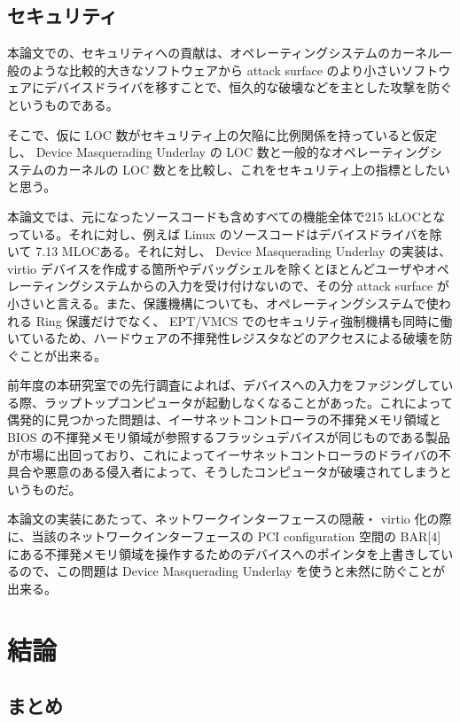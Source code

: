 \documentclass[a4paper,11pt,report]{ltjsbook}
\begin{document}
\section{セキュリティ}

本論文での、セキュリティへの貢献は、オペレーティングシステムのカーネル一般のような比較的大きなソフトウェアから attack surface のより小さいソフトウェアにデバイスドライバを移すことで、恒久的な破壊などを主とした攻撃を防ぐというものである。

そこで、仮に LOC 数がセキュリティ上の欠陥に比例関係を持っていると仮定し、 Device Masquerading Underlay の LOC 数と一般的なオペレーティングシステムのカーネルの LOC 数とを比較し、これをセキュリティ上の指標としたいと思う。

本論文では、元になったソースコードも含めすべての機能全体で215 kLOCとなっている。それに対し、例えば Linux のソースコードはデバイスドライバを除いて 7.13 MLOCある。それに対し、 Device Masquerading Underlay の実装は、 virtio デバイスを作成する箇所やデバッグシェルを除くとほとんどユーザやオペレーティングシステムからの入力を受け付けないので、その分 attack surface が小さいと言える。また、保護機構についても、オペレーティングシステムで使われる Ring 保護だけでなく、 EPT/VMCS でのセキュリティ強制機構も同時に働いているため、ハードウェアの不揮発性レジスタなどのアクセスによる破壊を防ぐことが出来る。

前年度の本研究室での先行調査によれば、デバイスへの入力をファジングしている際\cite{fuzzbisor}、ラップトップコンピュータが起動しなくなることがあった。これによって偶発的に見つかった問題は、イーサネットコントローラの不揮発メモリ領域と BIOS の不揮発メモリ領域が参照するフラッシュデバイスが同じものである製品が市場に出回っており、これによってイーサネットコントローラのドライバの不具合や悪意のある侵入者によって、そうしたコンピュータが破壊されてしまうというものだ。

本論文の実装にあたって、ネットワークインターフェースの隠蔽・ virtio 化の際に、当該のネットワークインターフェースの PCI configuration 空間の BAR[4] にある不揮発メモリ領域を操作するためのデバイスへのポインタを上書きしているので、この問題は Device Masquerading Underlay を使うと未然に防ぐことが出来る。

\chapter{結論}
\section{まとめ}
\end{document}
